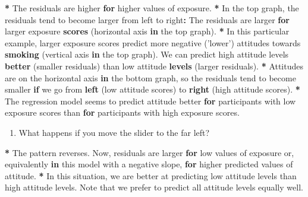 \documentclass[a4paper]{book}
\newenvironment{Shaded}{\begin{snugshade}}{\end{snugshade}}
\newcommand{\KeywordTok}[1]{\textcolor[rgb]{0,0,0}{\textbf{#1}}}
\newcommand{\StringTok}[1]{\textcolor[rgb]{0.00,0.00,0.00}{#1}}
\newcommand{\ControlFlowTok}[1]{\textcolor[rgb]{0.00,0.00,0.00}{\textbf{#1}}}
\newcommand{\OperatorTok}[1]{\textcolor[rgb]{0.00,0.00,0.00}{\textbf{#1}}}
\newcommand{\NormalTok}[1]{#1}
\providecommand{\tightlist}{%
  \setlength{\itemsep}{0pt}\setlength{\parskip}{0pt}}
\theoremstyle{definition}
\theoremstyle{definition}
\theoremstyle{definition}
\theoremstyle{remark}
\begin{document}
\begin{Shaded}
\begin{Highlighting}[]
\OperatorTok{*}\StringTok{ }\NormalTok{The residuals are higher }\ControlFlowTok{for}\NormalTok{ higher values of exposure.}
\OperatorTok{*}\StringTok{ }\NormalTok{In the top graph, the residuals tend to become larger from left to right}\OperatorTok{:}
\NormalTok{The residuals are larger }\ControlFlowTok{for}\NormalTok{ larger exposure }\KeywordTok{scores}\NormalTok{ (horizontal axis }\ControlFlowTok{in}\NormalTok{ the}
\NormalTok{top graph).}
\OperatorTok{*}\StringTok{ }\NormalTok{In this particular example, larger exposure scores predict more negative}
\NormalTok{(}\StringTok{'lower'}\NormalTok{) attitudes towards }\KeywordTok{smoking}\NormalTok{ (vertical axis }\ControlFlowTok{in}\NormalTok{ the top graph). We can}
\NormalTok{predict high attitude levels }\KeywordTok{better}\NormalTok{ (smaller residuals) than low attitude}
\KeywordTok{levels}\NormalTok{ (larger residuals).}
\OperatorTok{*}\StringTok{ }\NormalTok{Attitudes are on the horizontal axis }\ControlFlowTok{in}\NormalTok{ the bottom graph, so the residuals}
\NormalTok{tend to become smaller }\ControlFlowTok{if}\NormalTok{ we go from }\KeywordTok{left}\NormalTok{ (low attitude scores) to }\KeywordTok{right}\NormalTok{ (high}
\NormalTok{attitude scores).}
\OperatorTok{*}\StringTok{ }\NormalTok{The regression model seems to predict attitude better }\ControlFlowTok{for}\NormalTok{ participants with low}
\NormalTok{exposure scores than }\ControlFlowTok{for}\NormalTok{ participants with high exposure scores.}
\end{Highlighting}
\end{Shaded}

\begin{enumerate}
\def\labelenumi{\arabic{enumi}.}
\setcounter{enumi}{1}
\tightlist
\item
  What happens if you move the slider to the far left?
\end{enumerate}

\begin{Shaded}
\begin{Highlighting}[]
\OperatorTok{*}\StringTok{ }\NormalTok{The pattern reverses. Now, residuals are larger }\ControlFlowTok{for}\NormalTok{ low values of exposure}
\NormalTok{or, equivalently }\ControlFlowTok{in}\NormalTok{ this model with a negative slope, }\ControlFlowTok{for}\NormalTok{ higher predicted}
\NormalTok{values of attitude.}
\OperatorTok{*}\StringTok{ }\NormalTok{In this situation, we are better at predicting low attitude levels than high}
\NormalTok{attitude levels. Note that we prefer to predict all attitude levels equally}
\NormalTok{well.}
\end{Highlighting}
\end{Shaded}
\end{document}
